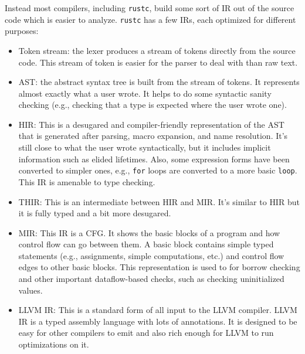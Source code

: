 \documentclass[paper=a4,%
  twoside,%
  BCOR4mm,%
  abstract=true,%
  toc=bibliography,%
  chapterprefix=true,%
  toc=bibliographynumbered,%
  open=right,%
  english,%
  pagesize=pdftex]{scrreprt}
\begin{document}
Instead most compilers, including \lstinline{rustc}, build some sort of \ac{IR} out of the source code which is easier to analyze. \lstinline{rustc} has a few \acp{IR}, each optimized for different purposes:

\begin{itemize}
    \item Token stream: the lexer produces a stream of tokens directly from the source code. This stream of token is easier for the parser to deal with than raw text.
    \item \ac{AST}: the abstract syntax tree is built from the stream of tokens. It represents almost exactly what a user wrote. It helps to do some syntactic sanity checking (e.g., checking that a type is expected where the user wrote one).
    \item \ac{HIR}: This is a desugared and compiler-friendly representation of the \ac{AST} that is generated after parsing, macro expansion, and name resolution. It's still close to what the user wrote syntactically, but it includes implicit information such as elided lifetimes. Also, some expression forms have been converted to simpler ones, e.g., \lstinline{for} loops are converted to a more basic \lstinline{loop}. This \ac{IR} is amenable to type checking.
    \item \ac{THIR}: This is an intermediate between \ac{HIR} and \ac{MIR}. It's similar to \ac{HIR} but it is fully typed and a bit more desugared.
    \item \ac{MIR}: This \ac{IR} is a \ac{CFG}. It shows the basic blocks of a program and how control flow can go between them. A basic block contains simple typed statements (e.g., assignments, simple computations, etc.) and control flow edges to other basic blocks. This representation is used to for borrow checking and other important dataflow-based checks, such as checking uninitialized values.
    \item LLVM \ac{IR}: This is a standard form of all input to the LLVM compiler. LLVM \ac{IR} is a typed assembly language with lots of annotations. It is designed to be easy for other compilers to emit and also rich enough for LLVM to run optimizations on it.
\end{itemize}
\end{document}

